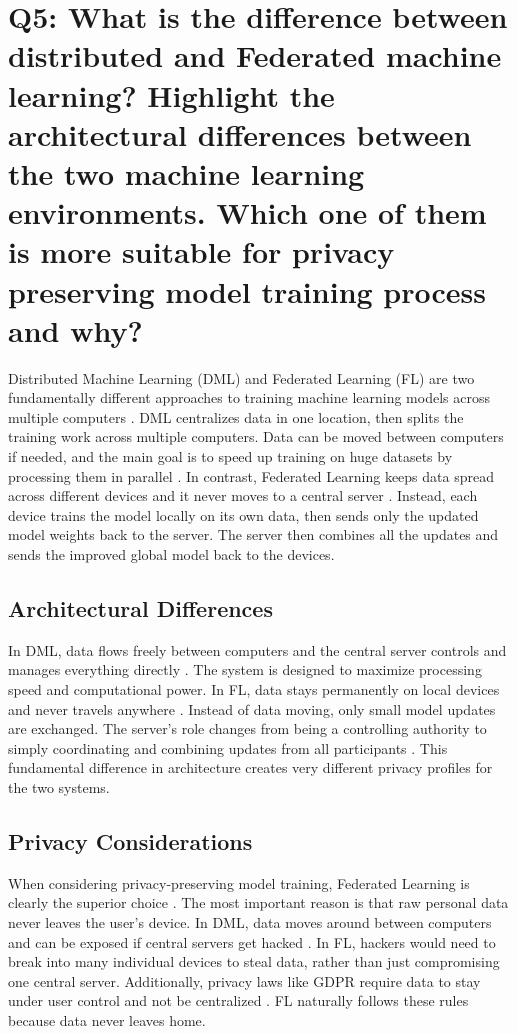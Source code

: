 \section{Q5: What is the difference between distributed and Federated machine learning?
Highlight the architectural differences between the two machine learning 
environments. Which one of them is more suitable for privacy preserving model 
training process and why?}
 
 
Distributed Machine Learning (DML) and Federated Learning (FL) are two fundamentally different approaches to training machine learning models across multiple computers \cite{Verbraeken2020}. DML centralizes data in one location, then splits the training work across multiple computers. Data can be moved between computers if needed, and the main goal is to speed up training on huge datasets by processing them in parallel \cite{Verbraeken2020}. In contrast, Federated Learning keeps data spread across different devices and it never moves to a central server \cite{Yang2021}. Instead, each device trains the model locally on its own data, then sends only the updated model weights back to the server. The server then combines all the updates and sends the improved global model back to the devices.
 
\subsection{Architectural Differences}
 
In DML, data flows freely between computers and the central server controls and manages everything directly \cite{Verbraeken2020}. The system is designed to maximize processing speed and computational power. In FL, data stays permanently on local devices and never travels anywhere \cite{Yang2021}. Instead of data moving, only small model updates are exchanged. The server's role changes from being a controlling authority to simply coordinating and combining updates from all participants \cite{Qian2020}. This fundamental difference in architecture creates very different privacy profiles for the two systems.
 
\subsection{Privacy Considerations}
 
When considering privacy-preserving model training, Federated Learning is clearly the superior choice \cite{Yang2021}. The most important reason is that raw personal data never leaves the user's device. In DML, data moves around between computers and can be exposed if central servers get hacked \cite{Verbraeken2020}. In FL, hackers would need to break into many individual devices to steal data, rather than just compromising one central server. Additionally, privacy laws like GDPR require data to stay under user control and not be centralized \cite{Yang2021}. FL naturally follows these rules because data never leaves home. 
 
